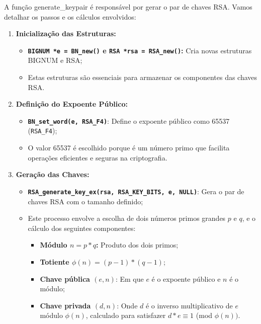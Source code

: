 \documentclass[a4paper,12pt]{article}
\begin{document}
A função generate\_keypair é responsável por gerar o par de chaves RSA. Vamos detalhar os passos e os cálculos envolvidos:
\begin{enumerate}
    \item \textbf{Inicialização das Estruturas:}
      \begin{itemize}
        \item \textbf{\lstinline[style=CStyle]{BIGNUM *e = BN_new()} e \lstinline[style=CStyle]{RSA *rsa = RSA_new()}:} Cria novas estruturas BIGNUM e RSA;
        \item Estas estruturas são essenciais para armazenar os componentes das chaves RSA.
      \end{itemize}
    \item \textbf{Definição do Expoente Público:}
      \begin{itemize}
        \item \textbf{\lstinline[style=CStyle]{BN_set_word(e, RSA_F4)}}: Define o expoente público como 65537 (\lstinline[style=CStyle]{RSA_F4});
        \item O valor 65537 é escolhido porque é um número primo que facilita operações eficientes e seguras na criptografia.
      \end{itemize}
    \item \textbf{Geração das Chaves:}
      \begin{itemize}
        \item \textbf{\lstinline[style=CStyle]{RSA_generate_key_ex(rsa, RSA_KEY_BITS, e, NULL)}}: Gera o par de chaves RSA com o tamanho definido;
        \item Este processo envolve a escolha de dois números primos grandes \(p\) e \(q\), e o cálculo dos seguintes componentes:
            \begin{itemize}
                \item \textbf{Módulo \(n = p * q\):} Produto dos dois primos;
                \item \textbf{Totiente \(\phi(n) = (p - 1) * (q - 1)\)};
                \item \textbf{Chave pública \((e, n)\)}: Em que \(e\) é o expoente público e \(n\) é o módulo;
                \item \textbf{Chave privada \((d, n)\)}: Onde \(d\) é o inverso multiplicativo de \(e\) módulo \(\phi(n)\), calculado para satisfazer \(d * e \equiv 1\) (mod \(\phi(n))\).
            \end{itemize}
      \end{itemize}
\end{enumerate}
\end{document}
